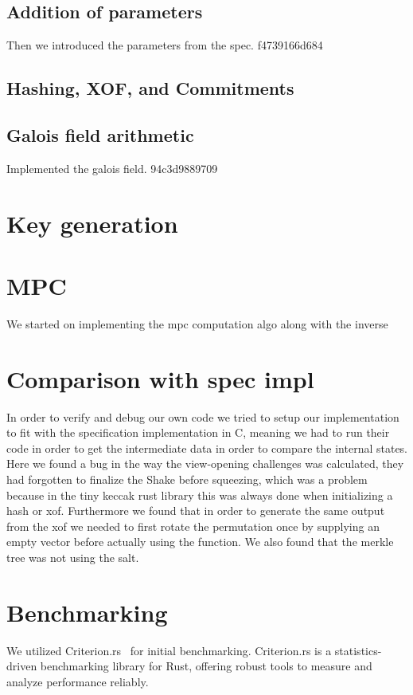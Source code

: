 \documentclass[twoside,11pt]{report}
\theoremstyle{definition}
\theoremstyle{plain}
\begin{document}
\subsection{Addition of parameters}
Then we introduced the parameters from the spec. f4739166d684

\subsection{Hashing, XOF, and Commitments}

\subsection{Galois field arithmetic}\label{}
Implemented the galois field. 94c3d9889709

\section{Key generation}

\section{MPC}\label{sub:mpc_algo}
We started on implementing the mpc computation algo along with the inverse

\section{Comparison with spec impl}\label{sub:comparison_with_spec_impl}
In order to verify and debug our own code we tried to setup our implementation to fit with the specification implementation in C, meaning we had to run their code in order to get the intermediate data in order to compare the internal states.
Here we found a bug in the way the view-opening challenges was calculated, they had forgotten to finalize the Shake before squeezing, which was a problem because in the tiny keccak rust library this was always done when initializing a hash or xof.
Furthermore we found that in order to generate the same output from the xof we needed to first rotate the permutation once by supplying an empty vector before actually using the function.
We also found that the merkle tree was not using the salt.

\section{Benchmarking}\label{sub:benchmarking} %
We utilized Criterion.rs~\cite{criterion} for initial benchmarking. Criterion.rs is a statistics-driven benchmarking library for Rust, offering robust tools to measure and analyze performance reliably.
\end{document}
